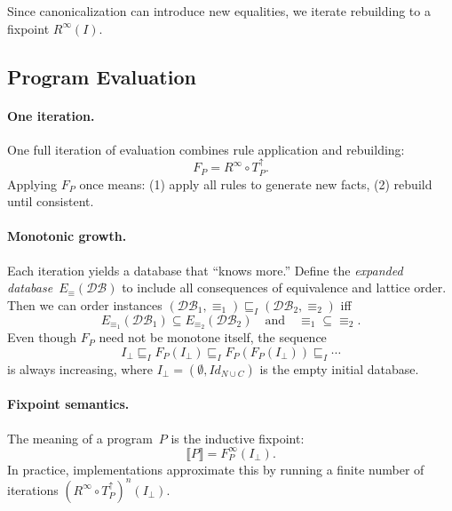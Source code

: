 \documentclass[acmsmall,screen, nonacm, anonymous]{acmart}
\newcommand{\DB}{\mathcal{DB}}               %
\begin{document}
Since canonicalization can introduce new equalities,
we iterate rebuilding to a fixpoint $R^\infty(I)$.


\subsection{Program Evaluation}

\paragraph{One iteration.}
One full iteration of evaluation combines rule application
and rebuilding:
\[
  F_P = R^\infty \circ T_P^\uparrow.
\]
Applying $F_P$ once means:
(1) apply all rules to generate new facts,
(2) rebuild until consistent.

\paragraph{Monotonic growth.}
Each iteration yields a database that ``knows more.''
Define the \emph{expanded database}~$E_\equiv(\DB)$
to include all consequences of equivalence and lattice order.
Then we can order instances $(\DB_1,\equiv_1)\sqsubseteq_I(\DB_2,\equiv_2)$
iff
\[
E_{\equiv_1}(\DB_1)\subseteq E_{\equiv_2}(\DB_2)
\quad\text{and}\quad
\equiv_1\subseteq\equiv_2.
\]
Even though $F_P$ need not be monotone itself,
the sequence
\[
I_\bot
\sqsubseteq_I F_P(I_\bot)
\sqsubseteq_I F_P(F_P(I_\bot))
\sqsubseteq_I \cdots
\]
is always increasing,
where $I_\bot=(\emptyset,\textit{Id}_{N\cup C})$
is the empty initial database.

\paragraph{Fixpoint semantics.}
The meaning of a program~$P$ is the inductive fixpoint:
\[
  \llbracket P \rrbracket = F_P^\infty(I_\bot).
\]
In practice, implementations approximate this by
running a finite number of iterations
$(R^\infty\circ T_P^\uparrow)^n(I_\bot)$.
\end{document}
